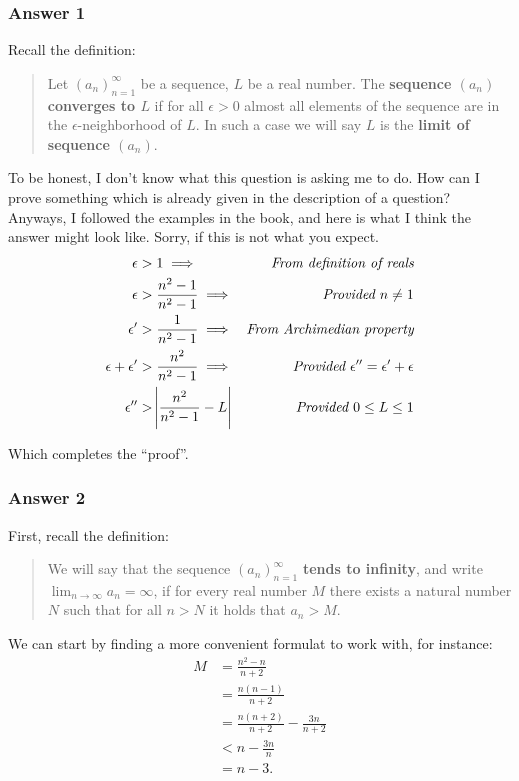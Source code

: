 \documentclass[11pt]{article}
\begin{document}
\subsubsection{Answer 1}
\label{sec-1-1-1}
Recall the definition:

\begin{quote}
Let $(a_n)^{\infty}_{n=1}$ be a sequence, $L$ be a real number.  The
\textbf{sequence $(a_n)$ converges to $L$} if for all $\epsilon > 0$ almost all
elements of the sequence are in the $\epsilon$-neighborhood of $L$.  In such
a case we will say $L$ is the \textbf{limit of sequence $(a_n)$}.
\end{quote}

To be honest, I don't know what this question is asking me to do.  How can
I prove something which is already given in the description of a question?
Anyways, I followed the examples in the book, and here is what I think the
answer might look like.  Sorry, if this is not what you expect.
\begin{equation*}
  \begin{aligned}
    \epsilon &> 1 \implies & \textit{From definition of reals} \\
    \epsilon &> \frac{n^2-1}{n^2-1} \implies & \textit{Provided $n \neq 1$} \\
    \epsilon' &> \frac{1}{n^2-1} \implies & \textit{From Archimedian property} \\
    \epsilon + \epsilon' &> \frac{n^2}{n^2-1} \implies
    & \textit{Provided $\epsilon'' = \epsilon' + \epsilon$} \\
    \epsilon'' &> \abs{\frac{n^2}{n^2-1} - L} & \textit{Provided $0 \leq L \leq 1$}
  \end{aligned}
\end{equation*}

Which completes the ``proof''.
\subsubsection{Answer 2}
\label{sec-1-1-2}
First, recall the definition:

\begin{quote}
We will say that the sequence $(a_n)^{\infty}_{n=1}$ \textbf{tends to infinity}, and
write $\lim_{n \to \infty} a_n = \infty$, if for every real number $M$ there
exists a natural number $N$ such that for all $n > N$ it holds that $a_n > M$.
\end{quote}

We can start by finding a more convenient formulat to work with, for instance:
\begin{equation*}
  \begin{aligned}
    M &= \frac{n^2 - n}{n + 2} \\
    &= \frac{n(n - 1)}{n + 2} \\
    &= \frac{n(n + 2)}{n + 2} - \frac{3n}{n + 2} \\
    &< n - \frac{3n}{n} \\
    &= n - 3.
  \end{aligned}
\end{equation*}
\end{document}
